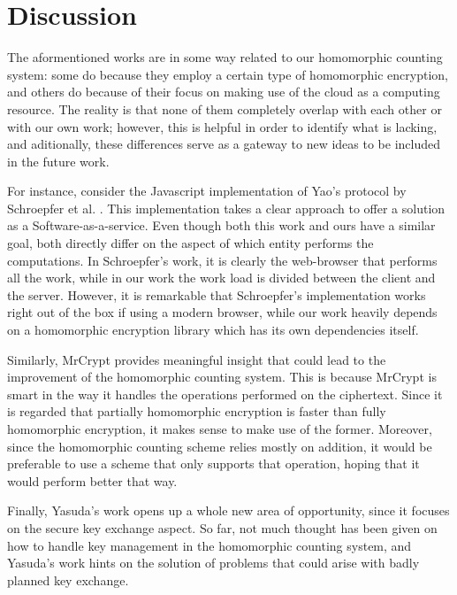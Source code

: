 \section{Discussion}

The aformentioned works are in some way related to our homomorphic counting system: some do because they employ a certain type of homomorphic encryption, and others do because of their focus on making use of the cloud as a computing resource. The reality is that none of them completely overlap with each other or with our own work; however, this is helpful in order to identify what is lacking, and aditionally, these differences serve as a gateway to new ideas to be included in the future work.

For instance, consider the Javascript implementation of Yao's protocol \cite{Yao:1986:GES:1382439.1382944} by Schroepfer et al. \cite{Schroepfer:2011:DSC:2046707.2093509}. This implementation takes a clear approach to offer a solution as a Software-as-a-service. Even though both this work and ours have a similar goal, both directly differ on the aspect of which entity performs the computations. In Schroepfer's work, it is clearly the web-browser that performs all the work, while in our work the work load is divided between the client and the server. However, it is remarkable that Schroepfer's implementation works right out of the box if using a modern browser, while our work heavily depends on a homomorphic encryption library which has its own dependencies itself.

Similarly, MrCrypt \cite{Tetali:2013:MSA:2544173.2509554} provides meaningful insight that could lead to the improvement of the homomorphic counting system. This is because MrCrypt is smart in the way it handles the operations performed on the ciphertext. Since it is regarded that partially homomorphic encryption is faster than fully homomorphic encryption, it makes sense to make use of the former. Moreover, since the homomorphic counting scheme relies mostly on addition, it would be preferable to use a scheme that only supports that operation, hoping that it would perform better that way.

Finally, Yasuda's \cite{Yasuda:2015:SDD:2732516.2732521} work opens up a whole new area of opportunity, since it focuses on the secure key exchange aspect. So far, not much thought has been given on how to handle key management in the homomorphic counting system, and Yasuda's work hints on the solution of problems that could arise with badly planned key exchange.

\clearpage
